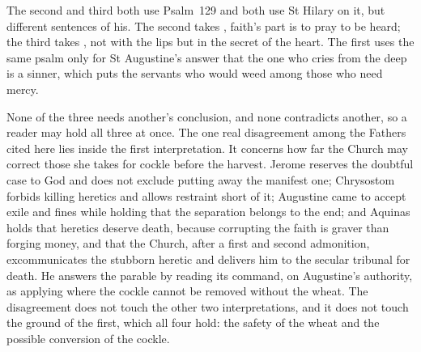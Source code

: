 The second and third both use Psalm~129 and both use St Hilary on it, but
different sentences of his. The second takes , faith's part is to pray to be heard; the third takes
, not with the lips but in the
secret of the heart. The first uses the same psalm only for St Augustine's
answer that the one who cries from the deep is a sinner, which puts the
servants who would weed among those who need mercy.

None of the three needs another's conclusion, and none contradicts another,
so a reader may hold all three at once. The one real disagreement among the
Fathers cited here lies inside the first interpretation. It concerns how far
the Church may correct those she takes for cockle before the harvest. Jerome
reserves the doubtful case to God and does not exclude putting away the
manifest one; Chrysostom forbids killing heretics and allows restraint short
of it; Augustine came to accept exile and fines while holding that the
separation belongs to the end; and Aquinas holds that heretics deserve
death, because corrupting the faith is graver than forging money, and that
the Church, after a first and second admonition, excommunicates the stubborn
heretic and delivers him to the secular tribunal for death. He answers the
parable by reading its command, on Augustine's authority, as applying where
the cockle cannot be removed without the wheat.
The disagreement does not touch the other two interpretations, and it does
not touch the ground of the first, which all four hold: the safety of the
wheat and the possible conversion of the cockle.
